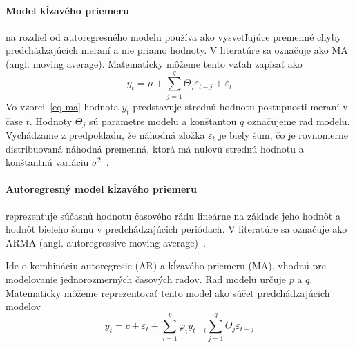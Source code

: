 \documentclass[a4paper,slovak,12pt,appendix]{article}
\begin{document}
\paragraph{Model kĺzavého priemeru} na rozdiel od autoregresného modelu používa
ako vysvetľujúce premenné chyby predchádzajúcich meraní a nie priamo hodnoty.
V literatúre sa označuje ako MA (angl. moving average). Matematicky môžeme tento
vzťah zapísať ako
\begin{equation}
  y_t = \mu + \sum_{j=1}^{q} \Theta_j \varepsilon_{t-j} + \varepsilon_t
  \label{eq-ma}
\end{equation}
Vo vzorci~\ref{eq-ma} hodnota $y_t$ predstavuje strednú hodnotu
postupnosti meraní v čase $t$. Hodnoty $\Theta_j$ sú parametre modelu
a konštantou $q$ označujeme rad modelu. Vychádzame z predpokladu, že náhodná
zložka $\varepsilon_t$ je biely šum, čo je rovnomerne distribuovaná náhodná
premenná, ktorá má nulovú strednú hodnotu a konštantnú variáciu
$\sigma^2$~\cite{Agrawal2013}.

\paragraph{Autoregresný model kĺzavého priemeru} reprezentuje súčasnú hodnotu
časového rádu lineárne na základe jeho hodnôt a hodnôt bieleho šumu
v predchádzajúcich periódach. V literatúre sa označuje ako ARMA (angl. autoregressive
moving average)~\cite{KumarSingh2013}.

Ide o kombináciu autoregresie (AR) a kĺzavého priemeru (MA), vhodnú pre
modelovanie jednorozmerných časových radov. Rad modelu určuje $p$ a $q$. Matematicky môžeme reprezentovať
tento model ako súčet predchádzajúcich modelov~\cite{Agrawal2013}
\begin{equation}
  y_t = c + \varepsilon_t + \sum_{i=1}^{p} \varphi_i y_{t-i}  \sum_{j=1}^{q} \Theta_j \varepsilon_{t-j}
  \label{eq-arma}
\end{equation}
\end{document}
